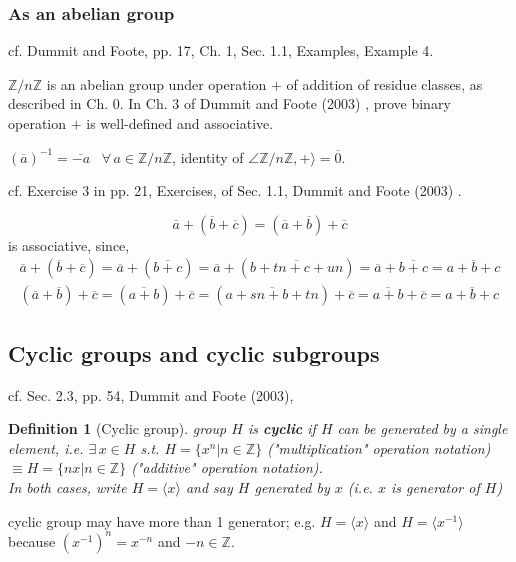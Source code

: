 \documentclass[10pt]{amsart}
\newtheorem{definition}{Definition}
\newcommand{\exercisehead}[1]
  { \smallskip
   \noindent{\small\bf Exercise #1.}
  }
\begin{document}
\begin{multicols*}{2}
\subsubsection{As an abelian group}

cf. Dummit and Foote, pp. 17, Ch. 1, Sec. 1.1, Examples, Example 4.

$\mathbb{Z}/n\mathbb{Z}$ is an abelian group under operation $+$ of addition of residue classes, as described in Ch. 0. In Ch. 3 of Dummit and Foote (2003) \cite{DuFo2003}, prove binary operation $+$ is well-defined and associative.

$(\overline{a})^{-1} = \overline{-a}$ \, $\forall \, a \in \mathbb{Z}/ n \mathbb{Z}$, identity of $\angle \mathbb{Z}/n\mathbb{Z}, + \rangle = \overline{0}$.

\exercisehead{3} cf. Exercise 3 in pp. 21, Exercises, of Sec. 1.1, Dummit and Foote (2003) \cite{DuFo2003}. 

\[
\overline{a}  + (\overline{b} + \overline{c}) = (\overline{a} + \overline{b}) + \overline{c} 
\]
is associative, since,
\[
\begin{gathered}
\overline{a} + (\overline{b} + \overline{c}) = \overline{a} + (\overline{b+c}) = \overline{a} + (\overline{b + tn + c + un}) = \overline{a} + \overline{b+c} = \overline{a+b+c} \\
(\overline{a} + \overline{b}) + \overline{c} = (\overline{a+b}) + \overline{c} = (\overline{a + sn + b+ tn}) + \overline{c} = \overline{a+b} + \overline{c} = \overline{a+b+c}
\end{gathered}
\]

\subsection{Cyclic groups and cyclic subgroups}

cf. Sec. 2.3, pp. 54, Dummit and Foote (2003), \cite{DuFo2003}

\begin{definition}[Cyclic group]\label{Def:CyclicGroup}
	group $H$ is \textbf{cyclic} if $H$ can be generated by a single element, i.e. $\exists \, x \in H$ s.t. $H= \lbrace x^n | n\in \mathbb{Z} \rbrace$ ("multiplication" operation notation) $\equiv H = \lbrace nx | n \in \mathbb{Z} \rbrace$ ("additive" operation notation). \\
	
	In both cases, write $H = \langle x \rangle$ and say $H$ \emph{generated} by $x$ (i.e. $x$ is \emph{generator} of $H$)
\end{definition}
	cyclic group may have more than 1 generator; e.g. $H = \langle x \rangle$ and $H = \langle x^{-1} \rangle$ because $(x^{-1})^n = x^{-n}$ and $-n \in \mathbb{Z}$. 
	

\end{multicols*}
\end{document}
